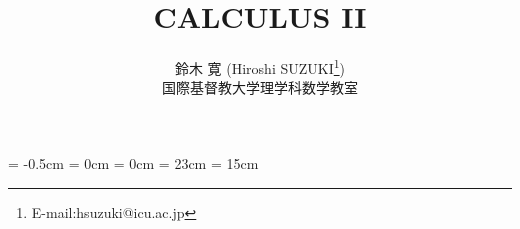 
\topmargin = -0.5cm
\oddsidemargin = 0cm \evensidemargin = 0cm
\textheight = 23cm \textwidth = 15cm %

\title{CALCULUS II}
      
\author{鈴木 寛 (Hiroshi SUZUKI\thanks{E-mail:hsuzuki@icu.ac.jp})\\ 
国際基督教大学理学科数学教室}

\renewcommand{\thepage}{%
	\arabic{section}--\arabic{page}}
\newcommand{\mysection}[1]{%
	\newpage\section{#1}\setcounter{page}{1}}

\newtheorem{thm}{定理}[section]
\newtheorem{prop}[thm]{命題}
\newtheorem{lemma}[thm]{補題}
\newtheorem{cor}[thm]{系}
\newtheorem{exercise}{練習問題}[section]
\newtheorem{example}{例}[section]
\newtheorem{problem}{問題}[section]
\newtheorem{defin}{定義}[section]
\newenvironment{definition}{\begin{defin} \rm}{\end{defin}}
\newenvironment{ex}{\begin{exercise} \rm}{\end{exercise}}
\newenvironment{eg}{\begin{example} \rm}{\end{example}}
\newenvironment{prob}{\begin{problem} \rm}{\end{problem}}
\newcommand{\remarks}{\vspace{2ex}\noindent{\bf Remarks.\quad}}
\newcommand{\note}{\vspace{2ex}\noindent{\gt 注\quad}}
\newcommand{\proof}{{\gt 証明\quad}}
\newcommand{\qed}{\hfill\hbox{\rule{6pt}{6pt}}}
\newcommand{\bZ}{\mbox{\boldmath $Z$}}
\newcommand{\bR}{\mbox{\boldmath $R$}}
\newcommand{\bC}{\mbox{\boldmath $C$}}
\newcommand{\bQ}{\mbox{\boldmath $Q$}}
\newcommand{\grad}{\mbox{grad}}

